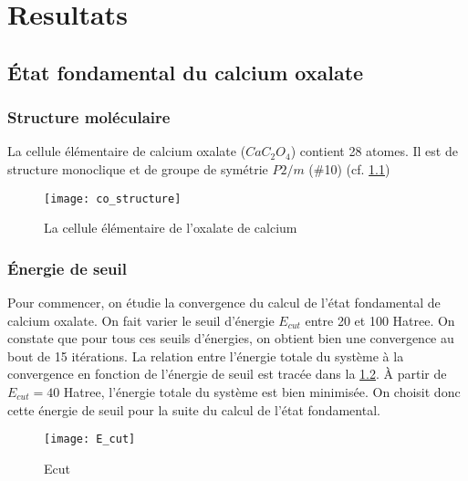 \chapter{Resultats}
\label{chap-results}

\section{État fondamental du calcium oxalate}
\subsection{Structure moléculaire}
La cellule élémentaire de calcium oxalate ($Ca C_2 O_4$) contient 28 atomes. Il est de structure monoclique et de groupe de symétrie $P2/m$ ($\#$10) (cf. \cref{BrillouinZone})

\begin{figure}[!h]\label{BrillouinZone}
    \centering
    \texttt{[image: co\_structure]}
    \caption{La cellule élémentaire de l'oxalate de calcium}
\end{figure}
\subsection{Énergie de seuil}
Pour commencer, on étudie la convergence du calcul de l'état fondamental de calcium oxalate. On fait varier le seuil d'énergie $E_{cut}$ entre 20 et 100 Hatree.
On constate que pour tous ces seuils d'énergies, on obtient bien une convergence au bout de 15 itérations. La relation entre l'énergie totale du système à la convergence en fonction de l'énergie de seuil est tracée dans la \cref{Ecut}.
À partir de $E_{cut} = 40$ Hatree, l'énergie totale du système est bien minimisée. On choisit donc cette énergie de seuil pour la suite du calcul de l'état fondamental.

\begin{figure}[!h]\label{Ecut}
    \centering
    \texttt{[image: E\_cut]}
    \caption{Ecut}
\end{figure}

